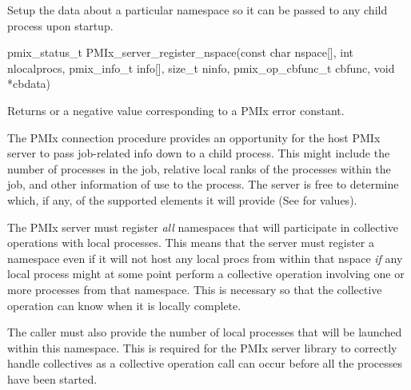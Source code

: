 Setup the data about a particular namespace so it can be passed to any child process upon startup.

\format

\cspecificstart
\begin{codepar}
pmix_status_t PMIx_server_register_nspace(const char nspace[], int nlocalprocs,
                                          pmix_info_t info[], size_t ninfo,
                                          pmix_op_cbfunc_t cbfunc, void *cbdata)
\end{codepar}
\cspecificend

\begin{arglist}
\end{arglist}

Returns  or a negative value corresponding to a PMIx error constant.

\descr

The PMIx connection procedure provides an opportunity for the host PMIx server to pass job-related info down to a child process.
This might include the number of processes in the job, relative local ranks of the processes within the job, and other information of use to the process.
The server is free to determine which, if any, of the supported elements it will provide (See  for values).

The PMIx server must register \emph{all} namespaces that will participate in collective operations with local processes.
This means that the server must register a namespace even if it will not host any local procs from within that nspace \emph{if} any local process might at some point perform a collective operation involving one or more processes from that namespace.
This is necessary so that the collective operation can know when it is locally complete.

The caller must also provide the number of local processes that will be launched within this namespace.
This is required for the PMIx server library to correctly handle collectives as a collective operation call can occur before all the processes have been started.


